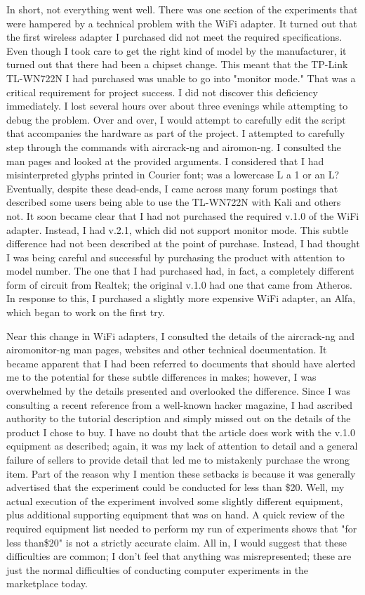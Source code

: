 In short, not everything went well.  There was one section of the experiments that were hampered by a technical problem with the WiFi adapter.  It turned out that the first wireless adapter I purchased did not meet the required specifications.  Even though I took care to get the right kind of model by the manufacturer, it turned out that there had been a chipset change.  This meant that the TP-Link TL-WN722N I had purchased was unable to go into "monitor mode."  That was a critical requirement for project success.  I did not discover this deficiency immediately.  I lost several hours over about three evenings while attempting to debug the problem.  Over and over, I would attempt to carefully edit the script that accompanies the hardware as part of the project.  I attempted to carefully step through the commands with aircrack-ng and airomon-ng.  I consulted the man pages and looked at the provided arguments.  I considered that I had misinterpreted glyphs printed in Courier font; was a lowercase L a 1 or an L?  Eventually, despite these dead-ends, I came across many forum postings that described some users being able to use the TL-WN722N with Kali and others not.  It soon became clear that I had not purchased the required v.1.0 of the WiFi adapter.  Instead, I had v.2.1, which did not support monitor mode.  This subtle difference had not been described at the point of purchase.  Instead, I had thought I was being careful and successful by purchasing the product with attention to model number.  The one that I had purchased had, in fact, a completely different form of circuit from Realtek; the original v.1.0 had one that came from Atheros.  In response to this, I purchased a slightly more expensive WiFi adapter, an Alfa, which began to work on the first try.

 Near this change in WiFi adapters, I consulted the details of the aircrack-ng and airomonitor-ng man pages, websites and other technical documentation.  It became apparent that I had been referred to documents that should have alerted me to the potential for these subtle differences in makes; however, I was overwhelmed by the details presented and overlooked the difference.  Since I was consulting a recent reference from a well-known hacker magazine, I had ascribed authority to the tutorial description and simply missed out on the details of the product I chose to buy.  I have no doubt that the article does work with the v.1.0 equipment as described; again, it was my lack of attention to detail and a general failure of sellers to provide detail that led me to mistakenly purchase the wrong item.  Part of the reason why I mention these setbacks is because it was generally advertised that the experiment could be conducted for less than \$20.  Well, my actual execution of the experiment involved some slightly different equipment, plus additional supporting equipment that was on hand.  A quick review of the required equipment list needed to perform my run of experiments shows that "for less than\$20" is not a strictly accurate claim.  All in, I would suggest that these difficulties are common; I don't feel that anything was misrepresented; these are just the normal difficulties of conducting computer experiments in the marketplace today.

